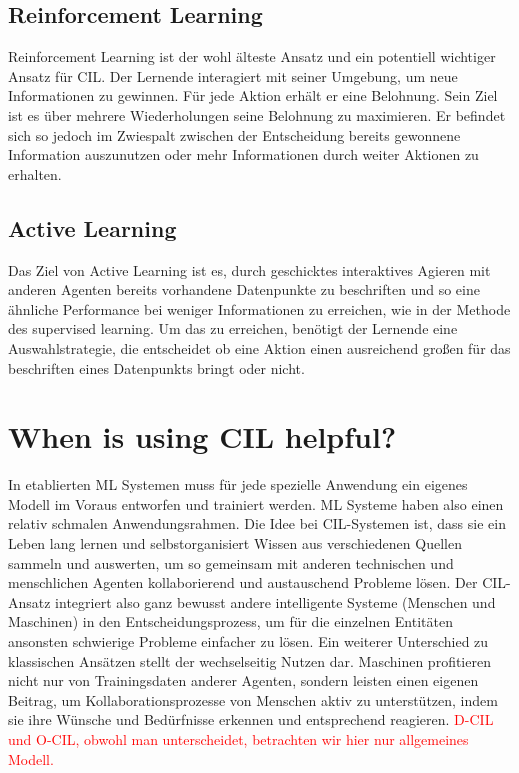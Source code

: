 \documentclass[conference,compsoc]{IEEEtran}
\newcommand\notes[1]{\textcolor{red}{#1}}
\begin{document}
\subsection{Reinforcement Learning}\label{reinforcement}
Reinforcement Learning ist der wohl älteste Ansatz und ein potentiell wichtiger Ansatz für CIL\@. 
Der Lernende interagiert mit seiner Umgebung, um neue Informationen zu gewinnen. Für jede Aktion 
erhält er eine Belohnung. Sein Ziel ist es über mehrere Wiederholungen seine Belohnung zu 
maximieren. Er befindet sich so jedoch im Zwiespalt zwischen der Entscheidung bereits gewonnene 
Information auszunutzen oder mehr Informationen durch weiter Aktionen zu erhalten.

\subsection{Active Learning}\label{active}
Das Ziel von Active Learning ist es, durch geschicktes interaktives Agieren mit anderen Agenten 
bereits vorhandene Datenpunkte zu beschriften und so eine ähnliche Performance bei weniger 
Informationen zu erreichen, wie in der Methode des supervised learning. Um das zu erreichen, 
benötigt der Lernende eine Auswahlstrategie\cite{ActiveToDedicated:calma}, die entscheidet ob 
eine Aktion einen ausreichend großen für das beschriften eines Datenpunkts bringt oder nicht.

\section{When is using CIL helpful?}\label{AdvantageOfCIL}
In etablierten ML Systemen muss für jede spezielle Anwendung ein eigenes Modell im Voraus 
entworfen und trainiert werden. ML Systeme haben also einen relativ schmalen Anwendungsrahmen. 
Die Idee bei CIL-Systemen ist, dass sie ein Leben lang lernen und selbstorganisiert Wissen 
aus verschiedenen Quellen sammeln und auswerten, um so gemeinsam mit anderen technischen 
und menschlichen Agenten kollaborierend und austauschend Probleme lösen\cite{CIL:sick}. 
Der CIL-Ansatz integriert also ganz bewusst andere intelligente Systeme 
(Menschen und Maschinen) in den Entscheidungsprozess, um für die einzelnen Entitäten 
ansonsten schwierige Probleme einfacher zu lösen.
Ein weiterer Unterschied zu klassischen Ansätzen stellt der wechselseitig Nutzen dar. 
Maschinen profitieren nicht nur von Trainingsdaten anderer Agenten, sondern leisten 
einen eigenen Beitrag, um Kollaborationsprozesse von Menschen aktiv zu unterstützen, indem 
sie ihre Wünsche und Bedürfnisse erkennen und entsprechend reagieren\cite{CIL:sick}.
\notes{D-CIL und O-CIL, obwohl man unterscheidet, betrachten wir hier nur allgemeines Modell.}
\end{document}
